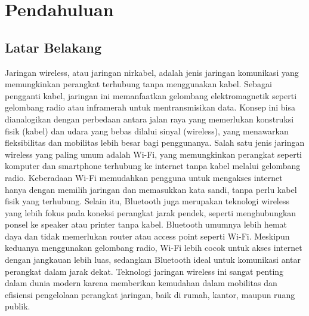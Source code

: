 \section{Pendahuluan}
\subsection{Latar Belakang}
Jaringan wireless, atau jaringan nirkabel, adalah jenis jaringan komunikasi yang memungkinkan perangkat terhubung tanpa menggunakan kabel. Sebagai pengganti kabel, jaringan ini memanfaatkan gelombang elektromagnetik seperti gelombang radio atau inframerah untuk mentransmisikan data. Konsep ini bisa dianalogikan dengan perbedaan antara jalan raya yang memerlukan konstruksi fisik (kabel) dan udara yang bebas dilalui sinyal (wireless), yang menawarkan fleksibilitas dan mobilitas lebih besar bagi penggunanya. Salah satu jenis jaringan wireless yang paling umum adalah Wi-Fi, yang memungkinkan perangkat seperti komputer dan smartphone terhubung ke internet tanpa kabel melalui gelombang radio. Keberadaan Wi-Fi memudahkan pengguna untuk mengakses internet hanya dengan memilih jaringan dan memasukkan kata sandi, tanpa perlu kabel fisik yang terhubung. Selain itu, Bluetooth juga merupakan teknologi wireless yang lebih fokus pada koneksi perangkat jarak pendek, seperti menghubungkan ponsel ke speaker atau printer tanpa kabel. Bluetooth umumnya lebih hemat daya dan tidak memerlukan router atau access point seperti Wi-Fi. Meskipun keduanya menggunakan gelombang radio, Wi-Fi lebih cocok untuk akses internet dengan jangkauan lebih luas, sedangkan Bluetooth ideal untuk komunikasi antar perangkat dalam jarak dekat. Teknologi jaringan wireless ini sangat penting dalam dunia modern karena memberikan kemudahan dalam mobilitas dan efisiensi pengelolaan perangkat jaringan, baik di rumah, kantor, maupun ruang publik.
